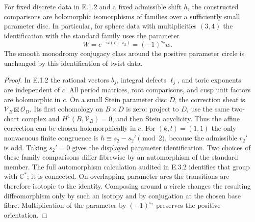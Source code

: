\begin{corollary}\label{push:src:E.1.3}
For fixed discrete data in E.1.2 and a fixed admissible shift $h$,
the constructed comparisons are holomorphic isomorphisms of families
over a sufficiently small parameter disc.  In particular, for sphere
data with multiplicities $(3,4)$ the identification with the standard
family uses the parameter
\[
 W=e^{-\pi i(c+s_2)}=(-1)^{s_2}w.
\]
The smooth monodromy conjugacy class around the positive parameter
circle is unchanged by this identification of twist data.
\end{corollary}
\begin{proof}
In E.1.2 the rational vectors $b_j$, integral defects $\ell_j$,
and toric exponents are independent of $c$.  All period matrices,
root comparisons, and cusp unit factors are holomorphic in $c$.
On a small Stein parameter disc $D$, the correction sheaf is
$\mathcal V_B\boxtimes\mathcal O_D$.  Its first cohomology on
$B\times D$ is zero: project to $D$, use the same two-chart
complex and $H^1(B,\mathcal V_B)=0$, and then Stein acyclicity.
Thus the affine correction can be chosen holomorphically in $c$.
For $(k,l)=(1,1)$ the only nonvacuous finite congruence is
$h\equiv s_2-s_2'\pmod2$, because the admissible $r_2'$ is odd.
Taking $s_2'=0$ gives the displayed parameter identification.
Two choices of these family comparisons differ fibrewise by an
automorphism of the standard member.  The full automorphism
calculation audited in E.3.2 identifies that group with $\mathbb C^*$;
it is connected.  On overlapping parameter arcs the transitions
are therefore isotopic to the identity.  Composing around a circle
changes the resulting diffeomorphism only by such an isotopy and
by conjugation at the chosen base fibre.  Multiplication of the
parameter by $(-1)^{s_2}$ preserves the positive orientation.
\end{proof}

